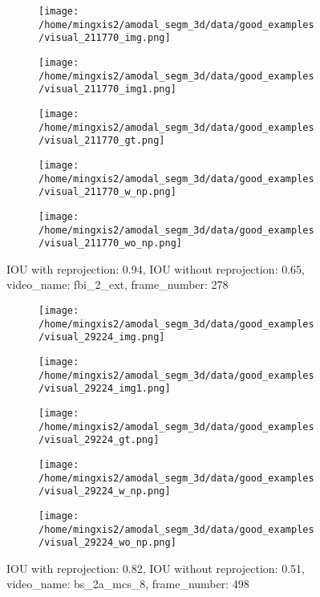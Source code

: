 \begin{figure}
\centering
\begin{subfigure}[t]{0.19\textwidth}
\centering
\texttt{[image: /home/mingxis2/amodal\_segm\_3d/data/good\_examples/visual\_211770\_img.png]}
\end{subfigure}
\begin{subfigure}[t]{0.19\textwidth}
\centering
\texttt{[image: /home/mingxis2/amodal\_segm\_3d/data/good\_examples/visual\_211770\_img1.png]}
\end{subfigure}
\begin{subfigure}[t]{0.19\textwidth}
\centering
\texttt{[image: /home/mingxis2/amodal\_segm\_3d/data/good\_examples/visual\_211770\_gt.png]}
\end{subfigure}
\begin{subfigure}[t]{0.19\textwidth}
\centering
\texttt{[image: /home/mingxis2/amodal\_segm\_3d/data/good\_examples/visual\_211770\_w\_np.png]}
\end{subfigure}
\begin{subfigure}[t]{0.19\textwidth}
\centering
\texttt{[image: /home/mingxis2/amodal\_segm\_3d/data/good\_examples/visual\_211770\_wo\_np.png]}
\end{subfigure}
\caption{IOU with reprojection: 0.94, IOU without reprojection: 0.65, video\_name: fbi\_2\_ext, frame\_number: 278}
\end{figure}
\begin{figure}
\centering
\begin{subfigure}[t]{0.19\textwidth}
\centering
\texttt{[image: /home/mingxis2/amodal\_segm\_3d/data/good\_examples/visual\_29224\_img.png]}
\end{subfigure}
\begin{subfigure}[t]{0.19\textwidth}
\centering
\texttt{[image: /home/mingxis2/amodal\_segm\_3d/data/good\_examples/visual\_29224\_img1.png]}
\end{subfigure}
\begin{subfigure}[t]{0.19\textwidth}
\centering
\texttt{[image: /home/mingxis2/amodal\_segm\_3d/data/good\_examples/visual\_29224\_gt.png]}
\end{subfigure}
\begin{subfigure}[t]{0.19\textwidth}
\centering
\texttt{[image: /home/mingxis2/amodal\_segm\_3d/data/good\_examples/visual\_29224\_w\_np.png]}
\end{subfigure}
\begin{subfigure}[t]{0.19\textwidth}
\centering
\texttt{[image: /home/mingxis2/amodal\_segm\_3d/data/good\_examples/visual\_29224\_wo\_np.png]}
\end{subfigure}
\caption{IOU with reprojection: 0.82, IOU without reprojection: 0.51, video\_name: bs\_2a\_mcs\_8, frame\_number: 498}
\end{figure}

